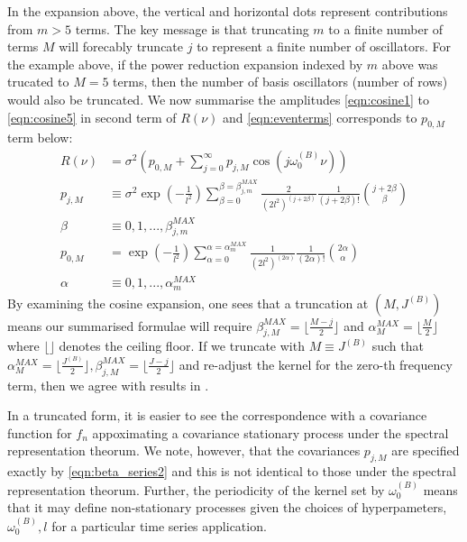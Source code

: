 In the expansion above, the vertical and horizontal dots represent contributions from $m>5$ terms. The key message is that truncating $m$ to a finite number of terms $M$ will forecably truncate $j$ to represent a finite number of oscillators. For the example above, if the power reduction expansion indexed by $m$ above was trucated to $M=5$ terms, then the  number of basis oscillators (number of rows) would also be truncated.  We now summarise the amplitudes \cref{eqn:cosine1} to  \cref{eqn:cosine5} in second term of $R(\nu)$ and  \cref{eqn:eventerms} corresponds to $p_{0,M}$ term below:
\begin{align}
R(\nu) &= \sigma^2 (p_{0,M} + \sum_{j=0}^{\infty} p_{j,M} \cos(j\omega_0^{(B)}  \nu))\\
p_{j,M} & \equiv \sigma^2 \exp (- \frac{1}{l^2}) \sum_{\beta = 0}^{\beta = \beta_{j,m}^{MAX}} \frac{2}{(2l^2)^{(j + 2\beta)}} \frac{1}{(j + 2\beta)!} \binom{j + 2\beta}{\beta} \label{eqn:beta_series2} \\
\beta &\equiv  0,1,..., \beta_{j,m}^{MAX}  \\
p_{0,M} &= \exp (- \frac{1}{l^2}) \sum_{\alpha = 0}^{\alpha = \alpha_{m}^{MAX}} \frac{1}{(2l^2)^{(2\alpha)}} \frac{1}{(2\alpha)!} \binom{2\alpha}{\alpha} \label{eqn:alpha_series}\\
\alpha &\equiv  0,1,..., \alpha_{m}^{MAX} 
\end{align}
By examining the cosine expansion, one sees that a truncation at $(M, J^{(B)} )$ means our summarised formulae will require $\beta_{j,M}^{MAX} = \lfloor\frac{M-j}{2}\rfloor$ and $\alpha_{M}^{MAX} = \lfloor\frac{M}{2}\rfloor$  where $\lfloor \rfloor$ denotes the ceiling floor. If we truncate with $M \equiv J^{(B)} $ such that $\alpha_{M}^{MAX} = \lfloor\frac{J^{(B)} }{2}\rfloor, \beta_{j,M}^{MAX} =  \lfloor\frac{J-j}{2}\rfloor $ and re-adjust the kernel for the zero-th frequency term, then we agree with results in \cite{solin2014explicit}.

In a truncated form, it is easier to see the correspondence with a covariance function for $f_n$ appoximating a covariance stationary process under the spectral representation theorum. We note, however, that the covariances $p_{j,M}$ are specified exactly by \cref{eqn:beta_series2} and this is not identical to those under the spectral representation theorum. Further, the periodicity of the kernel set by $\omega_0^{(B)} $ means that it may define non-stationary processes given the choices of hyperpameters, $\omega_0^{(B)}, l$ for a particular time series application.  

